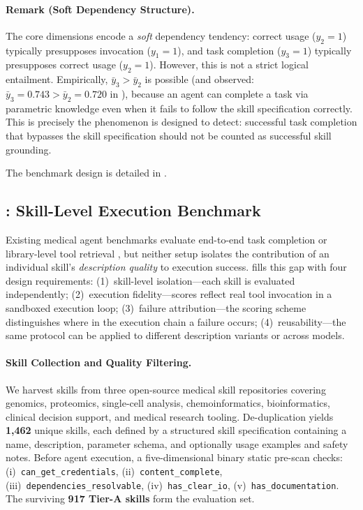 \paragraph{Remark (Soft Dependency Structure).}
The core dimensions encode a \emph{soft} dependency tendency: correct usage ($y_2{=}1$) typically presupposes invocation ($y_1{=}1$), and task completion ($y_3{=}1$) typically presupposes correct usage ($y_2{=}1$).
However, this is not a strict logical entailment.
Empirically, $\bar{y}_3 > \bar{y}_2$ is possible (and observed: $\bar{y}_3 = 0.743 > \bar{y}_2 = 0.720$ in ), because an agent can complete a task via parametric knowledge even when it fails to follow the skill specification correctly.
This is precisely the phenomenon \medskillbench is designed to detect: successful task completion that bypasses the skill specification should not be counted as successful skill grounding.

The benchmark design is detailed in .


\subsection{\medskillbench: Skill-Level Execution Benchmark}
\label{subsec:bench}

Existing medical agent benchmarks evaluate end-to-end task completion \citep{healthbench2025,medagentbench2025} or library-level tool retrieval \citep{skillsbench2026,skillnet2026}, but neither setup isolates the contribution of an individual skill's \emph{description quality} to execution success.
\medskillbench fills this gap with four design requirements:
(1)~skill-level isolation---each skill is evaluated independently;
(2)~execution fidelity---scores reflect real tool invocation in a sandboxed execution loop;
(3)~failure attribution---the scoring scheme distinguishes where in the execution chain a failure occurs;
(4)~reusability---the same protocol can be applied to different description variants or across models.

\paragraph{Skill Collection and Quality Filtering.}
We harvest skills from three open-source medical skill repositories covering genomics, proteomics, single-cell analysis, chemoinformatics, bioinformatics, clinical decision support, and medical research tooling.
De-duplication yields \textbf{1,462} unique skills, each defined by a structured skill specification containing a name, description, parameter schema, and optionally usage examples and safety notes.
Before agent execution, a five-dimensional binary static pre-scan checks:
(i)~\texttt{can\_get\_credentials},
(ii)~\texttt{content\_complete},
(iii)~\texttt{dependencies\_resolvable},
(iv)~\texttt{has\_clear\_io},
(v)~\texttt{has\_documentation}.
The surviving \textbf{917 Tier-A skills} form the evaluation set.

